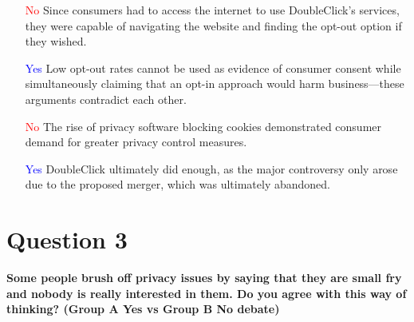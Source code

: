 \documentclass[12pt]{article}
\begin{document}
\begin{itemize}
    \item [\textcolor{red}{No}] Since consumers had to access the internet to use DoubleClick’s services, they were capable of navigating the website and finding the opt-out option if they wished.  
    \item [\textcolor{blue}{Yes}] Low opt-out rates cannot be used as evidence of consumer consent while simultaneously claiming that an opt-in approach would harm business—these arguments contradict each other.  
    \item [\textcolor{red}{No}] The rise of privacy software blocking cookies demonstrated consumer demand for greater privacy control measures.  
    \item [\textcolor{blue}{Yes}] DoubleClick ultimately did enough, as the major controversy only arose due to the proposed merger, which was ultimately abandoned.  
\end{itemize}


\section*{Question 3}
\textbf{Some people brush off privacy issues by saying that they are small fry and nobody is really interested in them. Do you agree with this way of thinking? (Group A Yes vs Group B No debate)}
\end{document}

